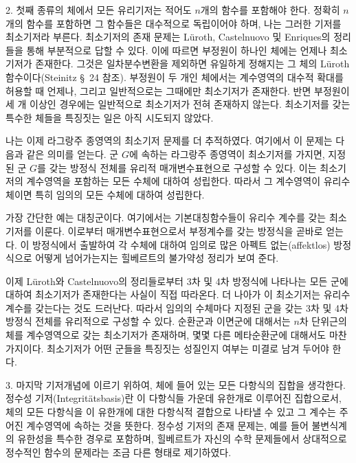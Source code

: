 2. 첫째 종류의 체에서 모든 유리기저는 적어도 $n$개의 함수를 포함해야 한다. 정확히 $n$개의 함수를 포함하면 그 함수들은 대수적으로 독립이어야 하며, 나는 그러한 기저를 \glqq{}최소기저\grqq{}라 부른다. 최소기저의 존재 문제는 Lüroth, Castelnuovo 및 Enriques의 정리들을 통해 부분적으로 답할 수 있다. 이에 따르면 부정원이 하나인 체에는 언제나 최소기저가 존재한다. 그것은 일차분수변환을 제외하면 유일하게 정해지는 그 체의 Lüroth 함수이다(Steinitz \S\ 24 참조). 부정원이 두 개인 체에서는 계수영역의 대수적 확대를 허용할 때 언제나, 그리고 일반적으로는 그때에만 최소기저가 존재한다. 반면 부정원이 세 개 이상인 경우에는 일반적으로 최소기저가 전혀 존재하지 않는다. 최소기저를 갖는 특수한 체들을 특징짓는 일은 아직 시도되지 않았다.

나는 이제 라그랑주 종영역의 최소기저 문제를 더 추적하였다. 여기에서 이 문제는 다음과 같은 의미를 얻는다. \glqq{}군 $G$에 속하는 라그랑주 종영역이 최소기저를 가지면, 지정된 군 $G$를 갖는 방정식 전체를 유리적 매개변수표현으로 구성할 수 있다. 이는 최소기저의 계수영역을 포함하는 모든 수체에 대하여 성립한다. 따라서 그 계수영역이 유리수체이면 특히 임의의 모든 수체에 대하여 성립한다.\grqq{}

가장 간단한 예는 대칭군이다. 여기에서는 기본대칭함수들이 유리수 계수를 갖는 최소기저를 이룬다. 이로부터 매개변수표현으로서 부정계수를 갖는 방정식을 곧바로 얻는다. 이 방정식에서 출발하여 각 수체에 대하여 임의로 많은 아펙트 없는(affektlos) 방정식으로 어떻게 넘어가는지는 힐베르트의 불가약성 정리가 보여 준다.

이제 Lüroth와 Castelnuovo의 정리들로부터 3차 및 4차 방정식에 나타나는 모든 군에 대하여 최소기저가 존재한다는 사실이 직접 따라온다. 더 나아가 이 최소기저는 유리수 계수를 갖는다는 것도 드러난다. 따라서 임의의 수체마다 지정된 군을 갖는 3차 및 4차 방정식 전체를 유리적으로 구성할 수 있다. 순환군과 이면군에 대해서는 $n$차 단위근의 체를 계수영역으로 갖는 최소기저가 존재하며, 몇몇 다른 메타순환군에 대해서도 마찬가지이다. 최소기저가 어떤 군들을 특징짓는 성질인지 여부는 미결로 남겨 두어야 한다.

3. 마지막 기저개념에 이르기 위하여, 체에 들어 있는 모든 다항식의 집합을 생각한다. \glqq{}정수성 기저(Integritätsbasis)\grqq{}란 이 다항식들 가운데 유한개로 이루어진 집합으로서, 체의 모든 다항식을 이 유한개에 대한 다항식적 결합으로 나타낼 수 있고 그 계수는 주어진 계수영역에 속하는 것을 뜻한다. 정수성 기저의 존재 문제는, 예를 들어 불변식계의 유한성을 특수한 경우로 포함하며, 힐베르트가 자신의 \glqq{}수학 문제들\grqq{}에서 상대적으로 정수적인 함수의 문제라는 조금 다른 형태로 제기하였다.

